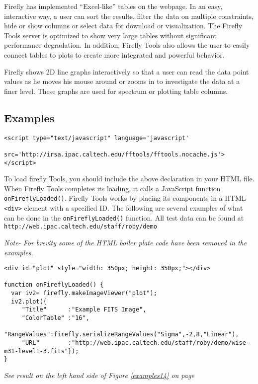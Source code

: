 \documentclass[11pt,twoside]{article}
\begin{document}
Firefly has implemented “Excel-like” tables on the webpage.  
In an easy, interactive way, a user can sort the results, filter the data on multiple constraints, 
hide or show columns or select data for download or visualization. 
The Firefly Tools server is optimized to show very large tables without significant performance degradation.
In addition, Firefly Tools also allows the user to easily connect tables to plots to create more integrated and powerful
behavior.

Firefly shows 2D line graphs interactively so that a user can read the data point values 
as he moves his mouse around or zooms in to investigate the data at a finer level. 
These graphs are used for spectrum or plotting table columns. 

\normalsize



\subsection*{Examples}

\scriptsize
\begin{verbatim}
<script type="text/javascript" language='javascript'
           src='http://irsa.ipac.caltech.edu/fftools/fftools.nocache.js'> </script>
\end{verbatim}
\normalsize
To load firefly Tools, you should include the above declaration in your HTML file.
When Firefly Tools completes its loading, it calls a JavaScript function 
\scriptsize \texttt{onFireflyLoaded()}\normalsize.  
Firefly Tools works by placing its components in a HTML \scriptsize\texttt{<div>} \normalsize element 
with a specified ID.  
The following are several examples of what can be done in 
the \scriptsize \texttt{onFireflyLoaded()} \normalsize function.
All test data can be found at \scriptsize \texttt{http://web.ipac.caltech.edu/staff/roby/demo} \normalsize

\small
\textit{Note- For brevity some of the HTML boiler plate code have been removed in the examples.}
\normalsize




\scriptsize
\begin{verbatim}
<div id="plot" style="width: 350px; height: 350px;"></div>

function onFireflyLoaded() {
  var iv2= firefly.makeImageViewer("plot");
  iv2.plot({   
     "Title"      :"Example FITS Image",
     "ColorTable" :"16",
     "RangeValues":firefly.serializeRangeValues("Sigma",-2,8,"Linear"),
     "URL"        :"http://web.ipac.caltech.edu/staff/roby/demo/wise-m31-level1-3.fits"});
}
\end{verbatim}
\small
\textit{See result on the left hand side of Figure \ref{examples14} on page~\pageref{examples14}}
\normalsize
        
\end{document}
